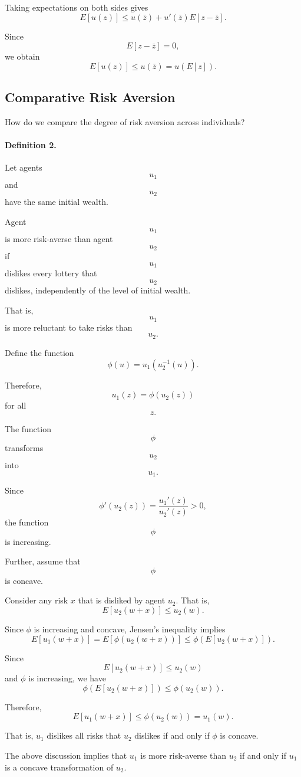 Taking expectations on both sides gives
\[
E[u(z)]
\le
u(\bar z)
+
u'(\bar z)E[z-\bar z].
\]

Since
\[
E[z-\bar z]=0,
\]
we obtain
\[
E[u(z)]
\le
u(\bar z)
=
u(E[z]).
\]

\subsection{Comparative Risk Aversion}

How do we compare the degree of risk aversion across individuals?

\paragraph{Definition 2.}

Let agents
\[
u_1
\]
and
\[
u_2
\]
have the same initial wealth.

Agent
\[
u_1
\]
is more risk-averse than agent
\[
u_2
\]
if
\[
u_1
\]
dislikes every lottery that
\[
u_2
\]
dislikes, independently of the level of initial wealth.

That is,
\[
u_1
\]
is more reluctant to take risks than
\[
u_2.
\]

Define the function
\[
\phi(u)
=
u_1(u_2^{-1}(u)).
\]

Therefore,
\[
u_1(z)
=
\phi(u_2(z))
\]
for all
\[
z.
\]

The function
\[
\phi
\]
transforms
\[
u_2
\]
into
\[
u_1.
\]

Since
\[
\phi'(u_2(z))
=
\frac{
u_1'(z)
}{
u_2'(z)
}
>0,
\]
the function
\[
\phi
\]
is increasing.

Further, assume that
\[
\phi
\]
is concave.




Consider any risk \(x\) that is disliked by agent \(u_2\). That is,
\[
E[u_2(w+x)]\le u_2(w).
\]

Since \(\phi\) is increasing and concave, Jensen's inequality implies
\[
E[u_1(w+x)]
=
E[\phi(u_2(w+x))]
\le
\phi(E[u_2(w+x)]).
\]

Since
\[
E[u_2(w+x)]\le u_2(w)
\]
and \(\phi\) is increasing, we have
\[
\phi(E[u_2(w+x)])
\le
\phi(u_2(w)).
\]

Therefore,
\[
E[u_1(w+x)]
\le
\phi(u_2(w))
=
u_1(w).
\]

That is, \(u_1\) dislikes all risks that \(u_2\) dislikes if and only if \(\phi\) is concave.

The above discussion implies that \(u_1\) is more risk-averse than \(u_2\) if and only if \(u_1\) is a concave transformation of \(u_2\).

